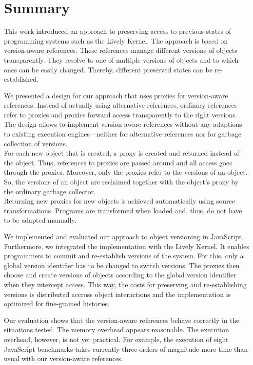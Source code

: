 \chapter{Summary} \label{chapter:SUMMARY}

This work introduced an approach to preserving access to previous states of programming systems such as the Lively Kernel.
The approach is based on version-aware references.
These references manage different versions of objects transparently.
They resolve to one of multiple versions of objects and to which ones can be easily changed.
Thereby, different preserved states can be re-established.

We presented a design for our approach that uses proxies for version-aware references.
Instead of actually using alternative references, ordinary references refer to proxies and proxies forward access transparently to the right versions.
The design allows to implement version-aware references without any adaptions to existing execution engines---neither for alternative references nor for garbage collection of versions.\\
For each new object that is created, a proxy is created and returned instead of the object.
Thus, references to proxies are passed around and all access goes through the proxies.
Moreover, only the proxies refer to the versions of an object.
So, the versions of an object are reclaimed together with the object's proxy by the ordinary garbage collector.\\
Returning new proxies for new objects is achieved automatically using source transformations.
Programs are transformed when loaded and, thus, do not have to be adapted manually.

We implemented and evaluated our approach to object versioning in JavaScript.
Furthermore, we integrated the implementation with the Lively Kernel.
It enables programmers to commit and re-establish versions of the system.
For this, only a global version identifier has to be changed to switch versions.
The proxies then choose and create versions of objects according to the global version identifier when they intercept access.
This way, the costs for preserving and re-establishing versions is distributed accross object interactions and the implementation is optimized for fine-grained histories.

Our evaluation shows that the version-aware references behave correctly in the situations tested.
The memory overhead appears reasonable.
The execution overhead, however, is not yet practical.
For example, the execution of eight JavaScript benchmarks takes currently three orders of magnitude more time than usual with our version-aware references.

